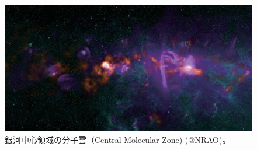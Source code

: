 \begin{figure}[t]
\begin{center}
\includegraphics[width=0.7\linewidth]{astrometry/CMZ.eps}
\end{center}
\vspace{-7mm}
\caption{銀河中心領域の分子雲（Central  Molecular Zone)  (@NRAO)。}
\label{c7.s4.f13}
\end{figure}

